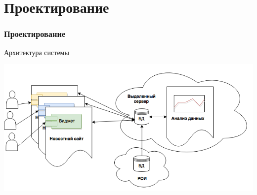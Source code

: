 \section{Проектирование}
\begin{frame}
\frametitle{Проектирование}
Архитектура системы

\vspace{0.5cm}
\includegraphics[width=1\textwidth]{images/arch2}
\end{frame}
